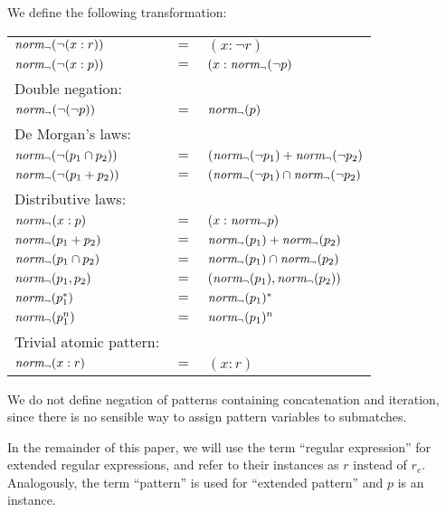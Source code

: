 \begin{defn}
   \label{defn-negnorm}
   We define the following transformation:

   \begin{tabular}{lll}
      $\mathit{norm_\neg}(\neg(x : r))$		& $=$	& $(x : \neg r)$					\\
      $\mathit{norm_\neg}(\neg(x : p))$		& $=$	& $(x : \mathit{norm_\neg}(\neg p)$				\\
      Double negation:			&	&							\\
      $\mathit{norm_\neg}(\neg(\neg p))$		& $=$	& $\mathit{norm_\neg}(p)$						\\
      De Morgan's laws:			&	&							\\
      $\mathit{norm_\neg}(\neg(p_1 \cap p_2))$	& $=$	& $(\mathit{norm_\neg}(\neg p_1) + \mathit{norm_\neg}(\neg p_2)$		\\
      $\mathit{norm_\neg}(\neg(p_1 + p_2))$	& $=$	& $(\mathit{norm_\neg}(\neg p_1) \cap \mathit{norm_\neg}(\neg p_2)$		\\
      Distributive laws:		&	&							\\
      $\mathit{norm_\neg}(x : p)$			& $=$	& $(x : \mathit{norm_\neg} p)$					\\
      $\mathit{norm_\neg}(p_1 + p_2)$		& $=$	& $\mathit{norm_\neg}(p_1) + \mathit{norm_\neg}(p_2)$			\\
      $\mathit{norm_\neg}(p_1 \cap p_2)$		& $=$	& $\mathit{norm_\neg}(p_1) \cap \mathit{norm_\neg}(p_2)$			\\
      $\mathit{norm_\neg}(p_1, p_2)$		& $=$	& $(\mathit{norm_\neg}(p_1), \mathit{norm_\neg}(p_2))$			\\
      $\mathit{norm_\neg}(p_1^*)$			& $=$	& $\mathit{norm_\neg}(p_1)^*$					\\
      $\mathit{norm_\neg}(p_1^n)$			& $=$	& $\mathit{norm_\neg}(p_1)^n$					\\
      Trivial atomic pattern:		&	&							\\
      $\mathit{norm_\neg}(x : r)$			& $=$	& $(x : r)$						\\
   \end{tabular}
\end{defn}

We do not define negation of patterns containing concatenation and iteration,
since there is no sensible way to assign pattern variables to submatches.

In the remainder of this paper, we will use the term ``regular expression''
for extended regular expressions, and refer to their instances as $r$ instead
of $r_e$.  Analogously, the term ``pattern'' is used for ``extended pattern''
and $p$ is an instance.

